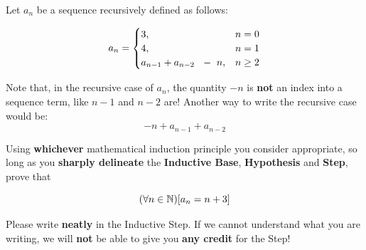 \documentclass[letterpaper,10pt]{article}
\begin{document}


{\large Let $a_n$ be a sequence recursively defined as follows: }

{\Large

\[ a_n = \begin{cases}3, & n = 0 \\ 4, & n = 1 \\ a_{\scriptsize n-1} + a_{\normalsize n-2}\ \   - \ n , & n \geq 2 \end{cases}\]		
}

{\large Note that, in the recursive case of $a_n$, the quantity $-n$ is {\bf not} an index into a sequence term, like $n-1$ and $n-2$ are! Another way to write the recursive case would be: {\Large \[ -n + a_{n-1} + a_{n-2}\] } }

{\large Using {\bf whichever} mathematical induction principle you consider appropriate, so long as you {\bf sharply delineate} the {\bf Inductive Base}, {\bf Hypothesis} and {\bf Step}, prove that}

{\Large \[ (\forall n \in \mathbb{N})[a_n = n + 3]\]}

 {\large Please write {\bf neatly} in the Inductive Step. If we cannot understand what you are writing, we will {\bf not} be able to give you \textbf{any credit} for the Step!}
 \vspace{-.2in}
 
\end{document}
